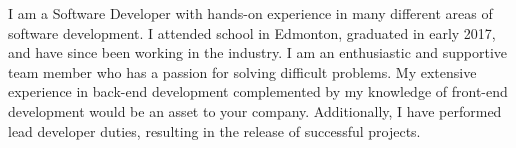 I am a Software Developer with hands-on experience in many different areas of software development.  I attended school in Edmonton, graduated in early 2017, and have since been working in the industry.  I am an enthusiastic and supportive team member who has a passion for solving difficult problems.  My extensive experience in back-end development complemented by my knowledge of front-end development would be an asset to your company.  Additionally, I have performed lead developer duties, resulting in the release of successful projects.